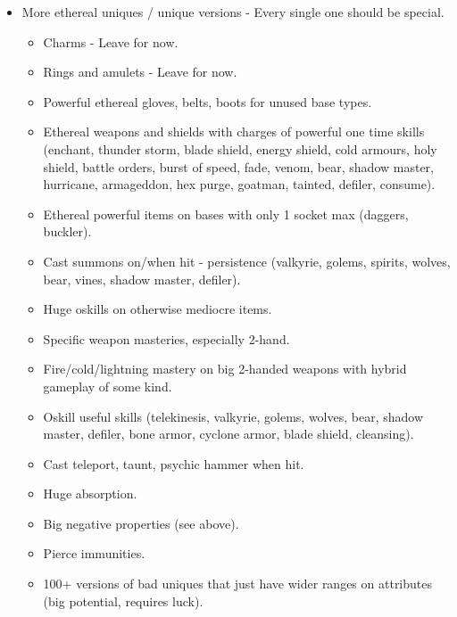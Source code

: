 \documentclass[12pt,a4paper]{article}
\begin{document}
\begin{itemize}

\item More ethereal uniques / unique versions - Every single one should be special.
\begin{itemize}
\item Charms - Leave for now.
\item Rings and amulets - Leave for now.
\item Powerful ethereal gloves, belts, boots for unused base types.
\item Ethereal weapons and shields with charges of powerful one time skills (enchant, thunder storm, blade shield, energy shield, cold armours, holy shield, battle orders, burst of speed, fade, venom, bear, shadow master, hurricane, armageddon, hex purge, goatman, tainted, defiler, consume).
\item Ethereal powerful items on bases with only 1 socket max (daggers, buckler).
\item Cast summons on/when hit - persistence (valkyrie, golems, spirits, wolves, bear, vines, shadow master, defiler).
\item Huge oskills on otherwise mediocre items.
\item Specific weapon masteries, especially 2-hand.
\item Fire/cold/lightning mastery on big 2-handed weapons with hybrid gameplay of some kind.
\item Oskill useful skills (telekinesis, valkyrie, golems, wolves, bear, shadow master, defiler, bone armor, cyclone armor, blade shield, cleansing).
\item Cast teleport, taunt, psychic hammer when hit.
\item Huge absorption.
\item Big negative properties (see above).
\item Pierce immunities.
\item 100+ versions of bad uniques that just have wider ranges on attributes (big potential, requires luck).
\end{itemize} 


\end{itemize}
\end{document}
